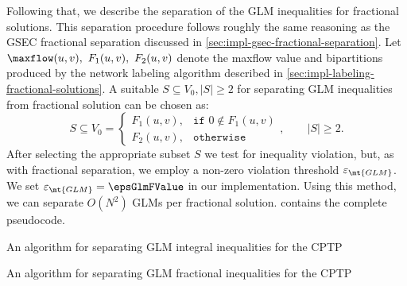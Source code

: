 Following that, we describe the separation of the GLM inequalities for fractional solutions.
This separation procedure follows roughly the same reasoning
as the GSEC fractional separation discussed in \cref{sec:impl-gsec-fractional-separation}.
Let $\maxflow(u, v),\ F_1(u, v),\ F_2(u, v)$ denote the maxflow value and bipartitions
produced by the network labeling algorithm described in \cref{sec:impl-labeling-fractional-solutions}.
A suitable $S \subseteq V_0, |S| \ge 2$ for separating GLM inequalities
from fractional solution can be chosen as:
\begin{equation}
	S \subseteq V_0 =
	\begin{cases}
		F_1(u, v), & \texttt{if } 0 \notin F_1(u, v) \\
		F_2(u, v), & \texttt{otherwise}
	\end{cases},
	\qquad
	|S| \ge 2.
\end{equation}
After selecting the appropriate subset $S$ we test for inequality violation, but,
as with fractional separation, we employ a non-zero violation threshold $\varepsilon_{\mt{GLM}}$.
We set $\varepsilon_{\mt{GLM}} = \epsGlmFValue$ in our implementation.
Using this method, we can separate $O(N^2)$ GLMs per fractional solution.
 contains the complete pseudocode.

\begin{algorithm}
	\caption{An algorithm for separating GLM integral inequalities for the CPTP}
	\label{algo:glm-integral-sep}
	
\end{algorithm}

\begin{algorithm}
	\caption{An algorithm for separating GLM fractional inequalities for the CPTP}
	\label{algo:glm-frac-sep}
	
\end{algorithm}

